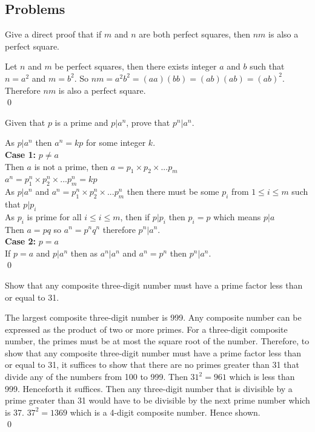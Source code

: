\documentclass[12pt]{exam}
\begin{document}
\subsection*{Problems}
\begin{questions}
    \question Give a direct proof that if $m$ and $n$ are both perfect squares, then $nm$ is also a perfect square.
    \begin{solution}
        Let $n$ and $m$ be perfect squares, then there exists integer $a$ and $b$ such that $n = a^2$ and $m = b^2$.
        So $nm = a^2 b^2 = (aa)(bb) = (ab)(ab) = (ab)^2$. Therefore $nm$ is also a perfect square.
        \\\qed
    \end{solution}

    \question Given that $p$ is a prime and $p|a^n$, prove that $p^n|a^n$. 
    \begin{solution}
            As $p|a^n$ then $a^n = kp$ for some integer $k$.
            \\\textbf{Case 1:} $p \neq a$
            \\Then $a$ is not a prime, then $a = p_1\times p_2 \times ... p_m$
            \\$a^n = p_1^n\times p_2^n \times ... p_m^n = kp$
            \\As $p|a^n$ and $a^n = p_1^n\times p_2^n \times ... p_m^n$ then there must be some $p_i$ from $1\leq i \leq m$ such that $p|p_i$
            \\As $p_i$ is prime for all $i \leq i \leq m$, then if $p|p_i$ then $p_i = p$ which means $p|a$
            \\Then $a = pq$ so $a^n = p^n q^n$ therefore $p^n|a^n$.
            \\\textbf{Case 2:} $p = a$ 
            \\If $p = a$  and $p|a^n$ then as $a^n|a^n$ and $a^n=p^n$ then $p^n|a^n$.
        \\\qed
    \end{solution}

    \question Show that any composite three-digit number must have a prime factor less than or equal to 31.
    \begin{solution}
        The largest composite three-digit number is 999.
        Any composite number can be expressed as the product of two or more primes. For a three-digit composite number, the primes must be at most the square root of the number. Therefore, to show that any composite three-digit number must have a prime factor less than or equal to 31, it suffices to show that there are no primes greater than 31 that divide any of the numbers from 100 to 999.
        Then $ 31^2 = 961 $ which is less than 999. Henceforth it suffices. 
        Then any three-digit number that is divisible by a prime greater than 31 would have to be divisible by the next prime number which is 37. $ 37^2 = 1369 $ which is a 4-digit composite number. Hence shown.
        \\\qed
    \end{solution}


\end{questions}
\end{document}
